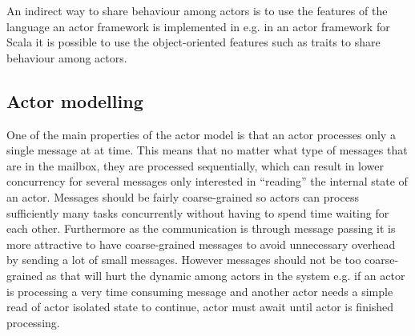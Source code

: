 An indirect way to share behaviour among actors is to use the features of the language an actor framework is implemented in e.g. in an actor framework for Scala it is possible to use the object-oriented features such as traits to share behaviour among actors.

\subsection{Actor modelling}\label{ssec:actor_modelling}
One of the main properties of the actor model is that an actor processes only a single message at at time. This means that no matter what type of messages that are in the mailbox, they are processed sequentially, which can result in lower concurrency for several messages only interested in ``reading'' the internal state of an actor. Messages should be fairly coarse-grained so actors can process sufficiently many tasks concurrently without having to spend time waiting for each other\cite[p. 269]{karmani2009actor}. Furthermore as the communication is through message passing it is more attractive to have coarse-grained messages to avoid unnecessary overhead by sending a lot of small messages. However messages should not be too coarse-grained as that will hurt the dynamic among actors in the system e.g. if an actor  is processing a very time consuming message and another actor  needs a simple read of actor  isolated state to continue, actor  must await until actor  is finished processing.


